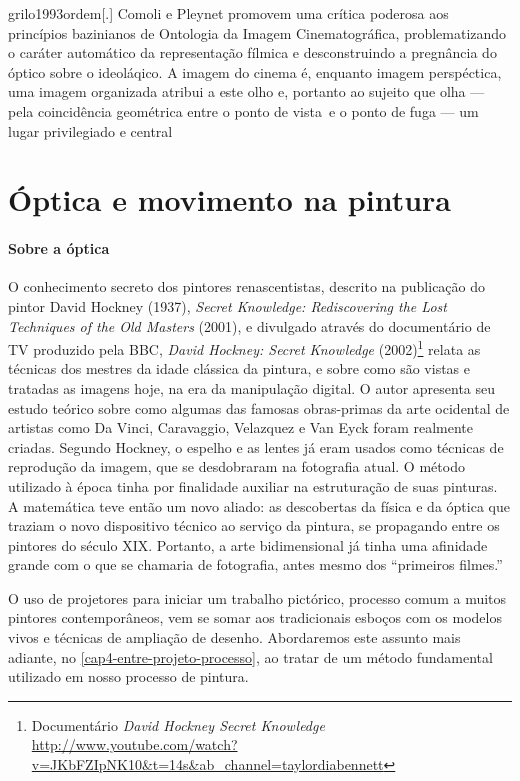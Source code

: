 \begin{displaycquote}[331-332]{grilo1993ordem}[.]
	Comoli e Pleynet promovem uma crítica poderosa aos princípios bazinianos
	de Ontologia da Imagem Cinematográfica, problematizando o caráter
	automático da representação fílmica e desconstruindo a pregnância do
	óptico sobre o ideoláqico. \textelp{} A imagem do cinema é, enquanto imagem
	perspéctica, uma imagem organizada \textelp{} atribui a este olho e, portanto
	ao sujeito que olha --- pela coincidência geométrica entre o ponto de
	vista~e o ponto de fuga --- um lugar privilegiado e central
\end{displaycquote}

\section{Óptica e movimento na pintura }%
\label{sec:optica-e-movimento-na-pintura}

\paragraph{Sobre a óptica} O conhecimento secreto dos pintores renascentistas, descrito na
publicação do pintor David Hockney (1937), \emph{Secret Knowledge:
	Rediscovering the Lost Techniques of the Old
	Masters} (2001), e
divulgado através do documentário de TV produzido pela BBC,
\emph{David Hockney: Secret Knowledge} (2002)\footnote{Documentário \emph{David
		Hockney Secret Knowledge}
	\url{http://www.youtube.com/watch?v=JKbFZIpNK10\&t=14s\&ab_channel=taylordiabennett}}
relata as técnicas dos mestres da idade clássica da pintura, e sobre
como são vistas e tratadas as imagens hoje, na era da manipulação
digital. O autor apresenta seu estudo teórico sobre como algumas das
famosas obras-primas da arte ocidental de artistas como Da Vinci,
Caravaggio, Velazquez e Van Eyck foram realmente criadas. Segundo
Hockney, o espelho e as lentes já eram usados como técnicas de
reprodução da imagem, que se desdobraram na fotografia atual. O método
utilizado à época tinha por finalidade auxiliar na estruturação de suas
pinturas. A matemática teve então um novo aliado: as descobertas da
física e da óptica que traziam o novo dispositivo técnico ao serviço da
pintura, se propagando entre os pintores do século XIX. Portanto, a
arte bidimensional já tinha uma afinidade grande com o que se chamaria
de fotografia, antes mesmo dos \enquote{primeiros filmes.}

O uso de projetores para iniciar um trabalho pictórico, processo comum
a muitos pintores contemporâneos, vem se somar aos tradicionais esboços
com os modelos vivos e técnicas de ampliação de desenho. Abordaremos
este assunto mais adiante, no \cref{cap4-entre-projeto-processo}, ao tratar de um método
fundamental utilizado em nosso processo de pintura.

